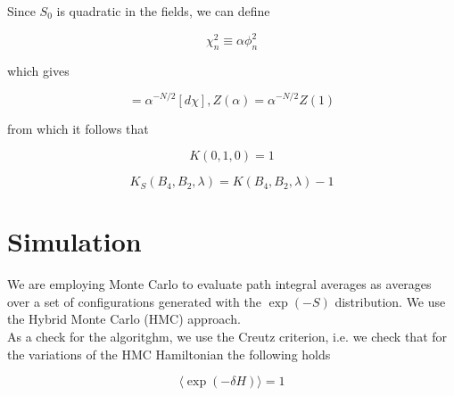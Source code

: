 \documentclass{article}
\begin{document}
\noindent Since $S_0$ is quadratic in the fields, we can define

\begin{equation}
\chi_n^2 \equiv \alpha \phi_n^2
\end{equation}

\noindent which gives

\begin{equation}
[d\phi] = \alpha^{-N/2} [d\chi], Z(\alpha) = \alpha^{-N/2} Z(1)
\end{equation}

\noindent from which it follows that

\begin{equation}
K(0,1,0) = 1
\end{equation}

\begin{equation}
K_S(B_4, B_2, \lambda) = K(B_4, B_2, \lambda) - 1
\end{equation}

\section{Simulation}

\noindent We are employing Monte Carlo to evaluate path integral averages as averages over a set of configurations
generated with the $\exp(-S)$ distribution. We use the Hybrid Monte Carlo (HMC) approach.\\

\noindent As a check for the algoritghm, we use the Creutz criterion, i.e. we check that for the variations of the HMC Hamiltonian
the following holds

\begin{equation}
\langle \exp \left( - \delta H \right) \rangle = 1
\end{equation}
\end{document}
